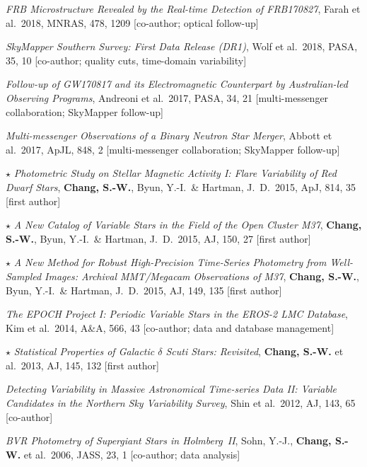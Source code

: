 \documentclass[letterpaper,11pt]{article}
\begin{document}
{\begin{etaremune}
\item \emph{FRB Microstructure Revealed by the Real-time Detection of FRB170827},
Farah et al.\ 2018, MNRAS, 478, 1209 [co-author; optical follow-up]

\item \emph{SkyMapper Southern Survey: First Data Release (DR1)}, Wolf et al.\ 2018,
PASA, 35, 10 [co-author; quality cuts, time-domain variability]

\item \emph{Follow-up of GW170817 and its Electromagnetic Counterpart by Australian-led
Observing Programs}, Andreoni et al.\ 2017, PASA, 34, 21
[multi-messenger collaboration; SkyMapper follow-up]

\item \emph{Multi-messenger Observations of a Binary Neutron Star Merger},
Abbott et al.\ 2017, ApJL, 848, 2 [multi-messenger collaboration; SkyMapper follow-up]

\item $\star$ \emph{Photometric Study on Stellar Magnetic Activity I: Flare Variability of
Red Dwarf Stars}, \textbf{Chang, S.-W.}, Byun, Y.-I.\ \& Hartman, J.~D.\ 2015, ApJ, 814, 35
[first author]

\item $\star$ \emph{A New Catalog of Variable Stars in the Field of the Open Cluster M37},
\textbf{Chang, S.-W.}, Byun, Y.-I.\ \& Hartman, J.~D.\ 2015, AJ, 150, 27 [first author]

\item $\star$ \emph{A New Method for Robust High-Precision Time-Series Photometry from
Well-Sampled Images: Archival MMT/Megacam Observations of M37}, \textbf{Chang, S.-W.},
Byun, Y.-I.\ \& Hartman, J.~D.\ 2015, AJ, 149, 135 [first author]

\item \emph{The EPOCH Project I: Periodic Variable Stars in the EROS-2 LMC Database},
Kim et al.\ 2014, A\&A, 566, 43 [co-author; data and database management]

\item $\star$ \emph{Statistical Properties of Galactic $\delta$ Scuti Stars: Revisited},
\textbf{Chang, S.-W.} et al.\ 2013, AJ, 145, 132 [first author]

\item \emph{Detecting Variability in Massive Astronomical Time-series Data II: Variable
Candidates in the Northern Sky Variability Survey}, Shin et al.\ 2012, AJ, 143, 65
[co-author]

\item \emph{BVR Photometry of Supergiant Stars in Holmberg~II}, Sohn, Y.-J.,
\textbf{Chang, S.-W.} et al.\ 2006, JASS, 23, 1 [co-author; data analysis]

\end{etaremune}
\par}
\end{document}
